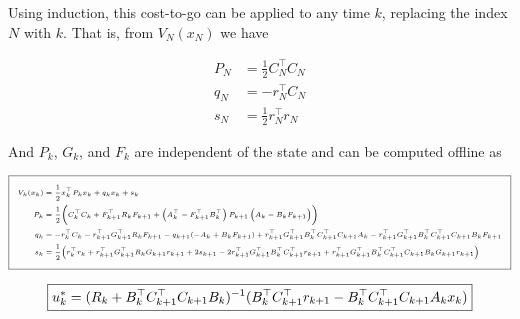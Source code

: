 \documentclass[11pt,letterpaper,onecolumn,notitlepage]{article}
\begin{document}
  Using induction, this cost-to-go can be applied to any time $k$, replacing the index $N$ with $k$.
  That is, from $V_{N}(x_{N})$ we have

  \begin{equation*}
    \begin{split}
      P_{N}&=\frac{1}{2}C_{N}^{\top}C_{N} \\
      q_{N}&=-r_{N}^{\top}C_{N} \\
      s_{N}&=\frac{1}{2}r_{N}^{\top}r_{N}
    \end{split}
  \end{equation*}

  And $P_{k}$, $G_{k}$, and $F_{k}$ are independent of the state and can be computed offline as

  \begin{equation*}
    \fontsize{6pt}{1pt}\selectfont
    \addtolength{\fboxsep}{5pt}
    \boxed{%
      \begin{split}
        V_{k}(x_{k})&=\frac{1}{2}x_{k}^{\top}P_{k}x_{k}+q_{k}x_{k}+s_{k} \\
        P_{k}&=\frac{1}{2}\biggr(C_{k}^{\top}C_{k}+F_{k+1}^{\top}R_{k}F_{k+1}+\left(A_{k}^{\top}-F_{k+1}^{\top}B_{k}^{\top}\right)P_{k+1}\left(A_{k}-B_{k}F_{k+1}\right)\biggr) \\
        q_{k}&=-r_{k}^{\top}C_{k}-r_{k+1}^{\top}G_{k+1}^{\top}R_{k}F_{k+1}-q_{k+1}(-A_{k}+B_{k}F_{k+1})+r_{k+1}^{\top}G_{k+1}^{\top}B_{k}^{\top}C_{k+1}^{\top}C_{k+1}A_{k}-r_{k+1}^{\top}G_{k+1}^{\top}B_{k}^{\top}C_{k+1}^{\top}C_{k+1}B_{k}F_{k+1} \\
        s_{k}&=\frac{1}{2}\bigr(r_{k}^{\top}r_{k}+r_{k+1}^{\top}G_{k+1}^{\top}R_{k}G_{k+1}r_{k+1}+2s_{k+1}-2r_{k+1}^{\top}G_{k+1}^{\top}B_{k}^{\top}C_{k+1}^{\top}r_{k+1}+r_{k+1}^{\top}G_{k+1}^{\top}B_{k}^{\top}C_{k+1}^{\top}C_{k+1}B_{k}G_{k+1}r_{k+1}\bigr)
      \end{split}
    }
  \end{equation*}

  \begin{equation*}
    \boxed{%
      u_{k}^{*}=(R_{k}+B_{k}^{\top}C_{k+1}^{\top}C_{k+1}B_{k})^{-1}(B_{k}^{\top}C_{k+1}^{\top}r_{k+1}-B_{k}^{\top}C_{k+1}^{\top}C_{k+1}A_{k}x_{k})
    }
  \end{equation*}

\end{document}
